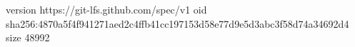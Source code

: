 version https://git-lfs.github.com/spec/v1
oid sha256:4870a5f4f941271aed2c4ffb41cc197153d58e77d9e5d3abc3f58d74a34692d4
size 48992
